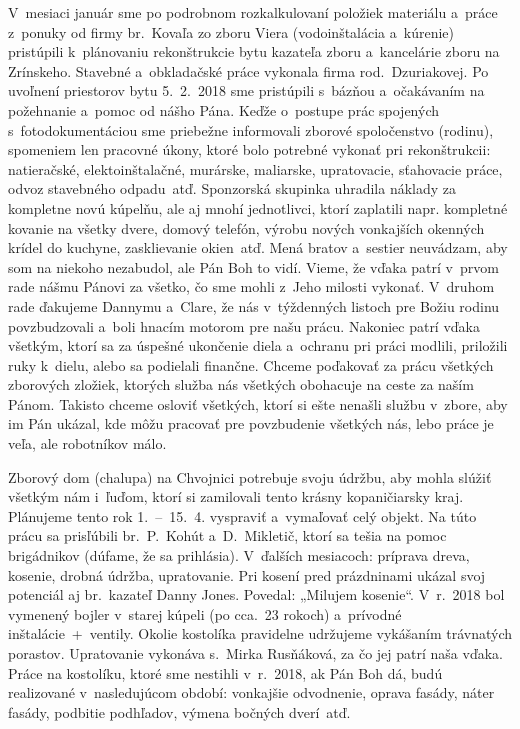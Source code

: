 

V~mesiaci január sme po podrobnom rozkalkulovaní položiek materiálu a~práce z~ponuky od firmy br.~Kovaľa zo zboru Viera (vodoinštalácia a~kúrenie) pristúpili k~plánovaniu rekonštrukcie bytu kazateľa zboru a~kancelárie zboru na Zrínskeho. Stavebné a~obkladačské práce vykonala firma rod.~Dzuriakovej. Po uvoľnení priestorov bytu 5.~2.~2018 sme pristúpili s~bázňou a~očakávaním na požehnanie a~pomoc od nášho Pána. Keďže o~postupe prác spojených s~fotodokumentáciou sme priebežne informovali zborové spoločenstvo (rodinu), spomeniem len pracovné úkony, ktoré bolo potrebné vykonať pri rekonštrukcii: natieračské, elektoinštalačné, murárske, maliarske, upratovacie, sťahovacie práce, odvoz stavebného odpadu~atď. Sponzorská skupinka uhradila náklady za kompletne novú kúpelňu, ale aj mnohí jednotlivci, ktorí zaplatili napr. kompletné kovanie na všetky dvere, domový telefón, výrobu nových vonkajších okenných krídel do kuchyne, zasklievanie okien~atď. Mená bratov a~sestier neuvádzam, aby som na niekoho nezabudol, ale Pán Boh to vidí.  Vieme, že vďaka patrí v~prvom rade nášmu Pánovi za všetko, čo sme mohli z~Jeho milosti vykonať. V~druhom rade ďakujeme Dannymu a~Clare, že nás v~týždenných listoch pre Božiu rodinu povzbudzovali a~boli hnacím motorom pre našu prácu. Nakoniec patrí vďaka všetkým, ktorí sa za úspešné ukončenie diela a~ochranu pri práci modlili, priložili ruky k~dielu, alebo sa podielali finančne.
Chceme poďakovať za prácu všetkých zborových zložiek, ktorých služba nás všetkých obohacuje na ceste za naším Pánom. Takisto chceme osloviť všetkých, ktorí si ešte nenašli službu v~zbore, aby im Pán ukázal, kde môžu pracovať pre povzbudenie všetkých nás, lebo práce je veľa, ale robotníkov málo.

Zborový dom (chalupa) na Chvojnici potrebuje svoju údržbu, aby mohla slúžiť všetkým nám i~ľuďom, ktorí si zamilovali tento krásny kopaničiarsky kraj. Plánujeme tento rok 1.~--~15.~4. vyspraviť a~vymaľovať celý objekt. Na túto prácu sa prisľúbili br.~P.~Kohút a~D.~Mikletič, ktorí sa tešia na pomoc brigádnikov (dúfame, že sa prihlásia). V~ďalších mesiacoch: príprava dreva, kosenie, drobná údržba, upratovanie. Pri kosení pred prázdninami ukázal svoj potenciál aj br.~kazateľ Danny Jones. Povedal: „Milujem kosenie“. V~r.~2018 bol vymenený bojler v~starej kúpeli (po cca.~23 rokoch) a~prívodné inštalácie~+~ventily. Okolie kostolíka pravidelne udržujeme vykášaním trávnatých porastov. Upratovanie vykonáva s.~Mirka Rusňáková, za čo jej patrí naša vďaka. Práce na kostolíku, ktoré sme nestihli v~r.~2018, ak Pán Boh dá, budú realizované v~nasledujúcom období: vonkajšie odvodnenie, oprava fasády, náter fasády, podbitie podhľadov, výmena bočných dverí~atď.

